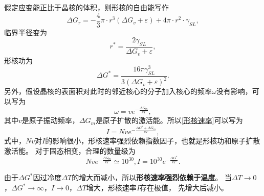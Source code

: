             假定应变能正比于晶核的体积，则形核的自由能写作
            \begin{equation}
                \Delta G_r=-\frac{4}{3}\pi \cdot r^3(\Delta G_v+\varepsilon)+4\pi\cdot r^2\cdot\gamma_{SL},
            \end{equation}
            临界半径变为
            \begin{equation}
                r^*=\frac{2\gamma_{SL}}{\Delta G_v+\varepsilon},
            \end{equation}
            形核功为
            \begin{equation}
                \Delta G^*=\frac{16\pi \gamma^3_{SL}}{3(\Delta G_v+\varepsilon)^2}.
            \end{equation}
            另外，假设晶核的表面积对此时的邻近核心的分子加入核心的频率$\omega$没有影响，可以写为
            \begin{equation}
                \omega=ve^{-\frac{\Delta G_m}{kT}},
            \end{equation}
            其中$v$是原子振动频率，$\Delta G_m$是原子扩散的激活能。所以\autoref{形核速率}可以写为
            \begin{equation}
                I=Nve^{-\frac{\Delta G^*+\Delta G_m}{kT}}\label{考虑外来扩散原子的形核速率},
            \end{equation}
            式中，$Nv$对$I$的影响很小，形核速率强烈依赖指数因子，也就是形核功和原子扩散激活能。
            对于固态相变，合理的数量级为
            \begin{equation*}
                Nve^{-\frac{\Delta G_m}{kT}}\simeq 10^{30},I=10^{30}e^{-\frac{\Delta G^*}{kT}}.
            \end{equation*}

            由于$\Delta G^*$因过冷度$\Delta T$的增大而减小，所以\textbf{形核速率强烈依赖于温度}。
            当$\Delta T\to0$，$\Delta G^*\to\infty$，$I\to0$，$\Delta T$增大，形核速率$I$存在极值，
            先增大后减小。


